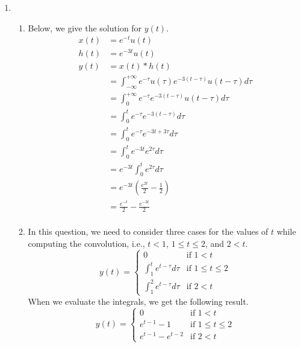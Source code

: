 \documentclass[10pt,a4paper, margin=1in]{article}
\begin{document}
\begin{enumerate}
\item      
    \begin{enumerate}
    \item Below, we give the solution for $y(t)$.
    	\begin{equation}
	\begin{split}
		x(t) & = e^{-t}u(t)\\
		h(t) & = e^{-3t}u(t)\\
		y(t) & = x(t) \ast h(t)\\
		& = \int_{-\infty}^{+\infty} e^{-\tau}u(\tau)e^{-3(t - \tau)}u(t - \tau)d\tau\\
		& = \int_{0}^{+\infty} e^{-\tau}e^{-3(t - \tau)}u(t - \tau)d\tau\\
		& = \int_{0}^{t} e^{-\tau}e^{-3(t - \tau)}d\tau\\
		& = \int_{0}^{t} e^{-\tau}e^{-3t + 3\tau}d\tau\\
		& = \int_{0}^{t} e^{-3t}e^{2\tau}d\tau\\
		& = e^{-3t} \int_{0}^{t} e^{2\tau}d\tau\\
		& = e^{-3t} \left( \frac{e^{2t}}{2} - \frac{1}{2} \right)\\
		& = \frac{e^{-t}}{2} - \frac{e^{-3t}}{2} \\ 
	\end{split}
	\end{equation}
    \item In this question, we need to consider three cases for the values of $t$ while computing the convolution, i.e., $t < 1$, $1 \leq t \leq 2$, and $2 < t$.
    	\begin{equation}
		y(t) = \begin{cases}  0 & \mbox{if } 1 < t \\ 
						\int_{1}^{t} e^{t - \tau} d\tau & \mbox{if } 1 \leq t \leq 2 \\
						 \int_{1}^{2} e^{t - \tau} d\tau & \mbox{if } 2 < t \end{cases}
	\end{equation}
	When we evaluate the integrals, we get the following result.
    	\begin{equation}
		y(t) = \begin{cases}  0 &\mbox{if } 1 < t \\ 
						 e^{t - 1} - 1 & \mbox{if } 1 \leq t \leq 2 \\
					 	 e^{t - 1} - e^{t - 2}& \mbox{if } 2 < t \end{cases}
	\end{equation}
    \end{enumerate}


\end{enumerate}
\end{document}

